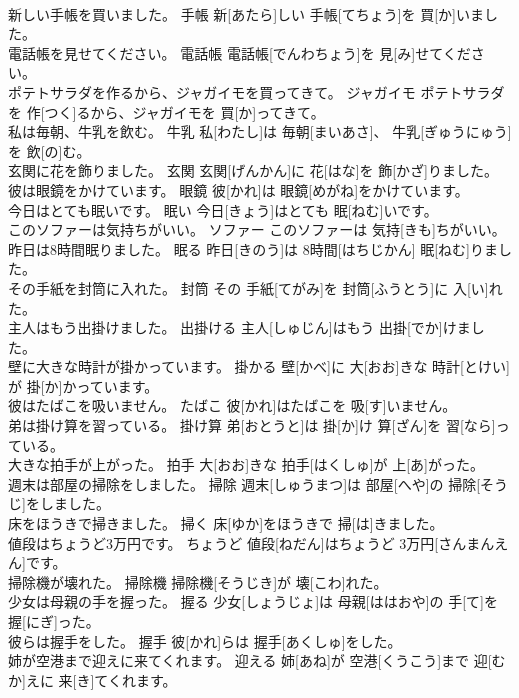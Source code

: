 \documentclass[8pt]{extreport}
\begin{document}
\begin{CJK}{UTF8}{min}
\\	新しい手帳を買いました。	手帳	新[あたら]しい 手帳[てちょう]を 買[か]いました。	
\\	電話帳を見せてください。	電話帳	電話帳[でんわちょう]を 見[み]せてください。	
\\	ポテトサラダを作るから、ジャガイモを買ってきて。	ジャガイモ	ポテトサラダを 作[つく]るから、ジャガイモを 買[か]ってきて。	
\\	私は毎朝、牛乳を飲む。	牛乳	私[わたし]は 毎朝[まいあさ]、 牛乳[ぎゅうにゅう]を 飲[の]む。	
\\	玄関に花を飾りました。	玄関	玄関[げんかん]に 花[はな]を 飾[かざ]りました。	
\\	彼は眼鏡をかけています。	眼鏡	彼[かれ]は 眼鏡[めがね]をかけています。	
\\	今日はとても眠いです。	眠い	今日[きょう]はとても 眠[ねむ]いです。	
\\	このソファーは気持ちがいい。	ソファー	このソファーは 気持[きも]ちがいい。	
\\	昨日は8時間眠りました。	眠る	昨日[きのう]は 8時間[はちじかん] 眠[ねむ]りました。	
\\	その手紙を封筒に入れた。	封筒	その 手紙[てがみ]を 封筒[ふうとう]に 入[い]れた。	
\\	主人はもう出掛けました。	出掛ける	主人[しゅじん]はもう 出掛[でか]けました。	
\\	壁に大きな時計が掛かっています。	掛かる	壁[かべ]に 大[おお]きな 時計[とけい]が 掛[か]かっています。	
\\	彼はたばこを吸いません。	たばこ	彼[かれ]はたばこを 吸[す]いません。	
\\	弟は掛け算を習っている。	掛け算	弟[おとうと]は 掛[か]け 算[ざん]を 習[なら]っている。	
\\	大きな拍手が上がった。	拍手	大[おお]きな 拍手[はくしゅ]が 上[あ]がった。	
\\	週末は部屋の掃除をしました。	掃除	週末[しゅうまつ]は 部屋[へや]の 掃除[そうじ]をしました。	
\\	床をほうきで掃きました。	掃く	床[ゆか]をほうきで 掃[は]きました。	
\\	値段はちょうど3万円です。	ちょうど	値段[ねだん]はちょうど 3万円[さんまんえん]です。	
\\	掃除機が壊れた。	掃除機	掃除機[そうじき]が 壊[こわ]れた。	
\\	少女は母親の手を握った。	握る	少女[しょうじょ]は 母親[ははおや]の 手[て]を 握[にぎ]った。	
\\	彼らは握手をした。	握手	彼[かれ]らは 握手[あくしゅ]をした。	
\\	姉が空港まで迎えに来てくれます。	迎える	姉[あね]が 空港[くうこう]まで 迎[むか]えに 来[き]てくれます。	

\end{CJK}
\end{document}
